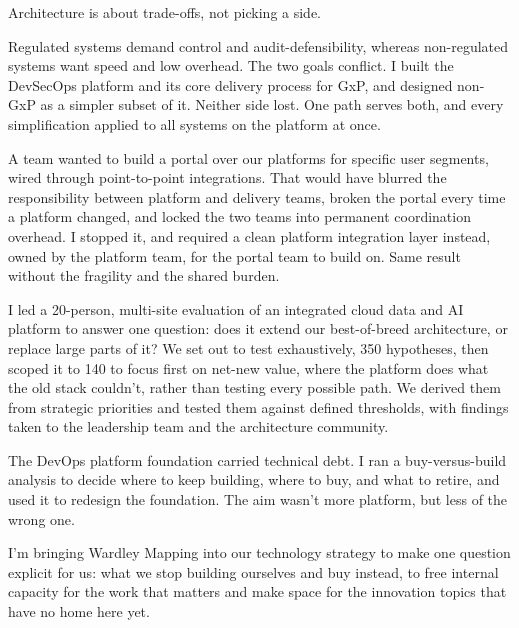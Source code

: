 \documentclass[11pt, a4paper]{awesome-cv}
\begin{document}
{

Architecture is about trade-offs, not picking a side.

 Regulated systems demand control and audit-defensibility, whereas non-regulated systems want speed and low overhead. The two goals conflict. I built the DevSecOps platform and its core delivery process for GxP, and designed non-GxP as a simpler subset of it. Neither side lost. One path serves both, and every simplification applied to all systems on the platform at once.


 A team wanted to build a portal over our platforms for specific user segments, wired through point-to-point integrations. That would have blurred the responsibility between platform and delivery teams, broken the portal every time a platform changed, and locked the two teams into permanent coordination overhead. I stopped it, and required a clean platform integration layer instead, owned by the platform team, for the portal team to build on. Same result without the fragility and the shared burden.

 I led a 20-person, multi-site evaluation of an integrated cloud data and AI platform to answer one question: does it extend our best-of-breed architecture, or replace large parts of it? We set out to test exhaustively, 350 hypotheses, then scoped it to 140 to focus first on net-new value, where the platform does what the old stack couldn't, rather than testing every possible path. We derived them from strategic priorities and tested them against defined thresholds, with findings taken to the leadership team and the architecture community.

 The DevOps platform foundation carried technical debt. I ran a buy-versus-build analysis to decide where to keep building, where to buy, and what to retire, and used it to redesign the foundation. The aim wasn't more platform, but less of the wrong one.

 I'm bringing Wardley Mapping into our technology strategy to make one question explicit for us: what we stop building ourselves and buy instead, to free internal capacity for the work that matters and make space for the innovation topics that have no home here yet.


}
\end{document}
